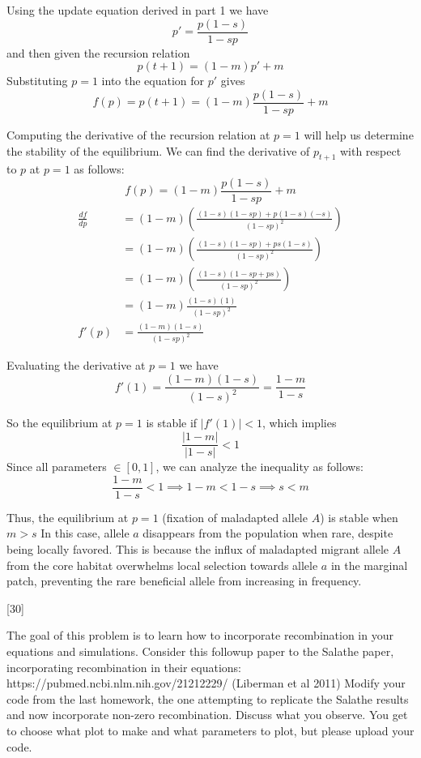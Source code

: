 \documentclass[11pt]{exam}
\begin{document}
\begin{questions}
\begin{enumerate}
\begin{mysolution}
    Using the update equation derived in part 1 we have
    \[
    p' = \frac{p(1-s)}{1-sp}
    \]
    and then given the recursion relation
    \[
    p(t+1) = (1-m)p' + m
    \]
    Substituting $p = 1$ into the equation for $p'$ gives
    \[
    f(p) = p(t+1) = (1-m) \frac{p(1-s)}{1-sp} + m
    \]

    Computing the derivative of the recursion relation at $p = 1$ will help us determine the stability of the equilibrium. We can find the derivative of $p_{t+1}$ with respect to $p$ at $p=1$ as follows:
    \[
    f(p) = (1-m) \frac{p(1-s)}{1-sp} + m
    \]
    \begin{align*}
    \frac{df}{dp} &= (1-m) \left( \frac{(1-s)(1-sp) + p(1-s)(-s)}{(1-sp)^2} \right) \\
    &= (1-m) \left( \frac{(1-s)(1-sp) + ps(1-s)}{(1-sp)^2} \right) \\
    &= (1-m) \left( \frac{(1-s)(1 - sp + ps)}{(1-sp)^2} \right) \\
    &= (1-m) \frac{(1-s)(1)}{(1-sp)^2} \\
    f'(p) &= \frac{(1-m)(1-s)}{(1-sp)^2}
    \end{align*}

    Evaluating the derivative at $p = 1$ we have
    \[
    f'(1) = \frac{(1-m)(1-s)}{(1-s)^2} = \frac{1-m}{1-s}
    \]

    So the equilibrium at $p = 1$ is stable if $|f'(1)| < 1$, which implies
    \[
    \frac{|1-m|}{|1-s|} < 1
    \]
    Since all parameters $\in [0,1]$, we can analyze the inequality as follows:
    \[
    \frac{1-m}{1-s} < 1 \implies 1-m < 1-s \implies s < m
    \]

    Thus, the equilibrium at $p=1$ (fixation of maladapted allele $A$) is stable when 
    \(
    m>s
    \)
    In this case, allele $a$ disappears from the population when rare, despite being locally favored. This is because the influx of maladapted migrant allele $A$ from the core habitat overwhelms local selection towards allele $a$ in the marginal patch, preventing the rare beneficial allele from increasing in frequency.
\end{mysolution}
\end{enumerate}

 [30] 

The goal of this problem is to learn how to incorporate recombination in your equations and
simulations. Consider this followup paper to the Salathe paper, incorporating recombination
in their equations: https://pubmed.ncbi.nlm.nih.gov/21212229/ (Liberman et al 2011)
Modify your code from the last homework, the one attempting to replicate the Salathe results
and now incorporate non-zero recombination. Discuss what you observe. You get to choose
what plot to make and what parameters to plot, but please upload your code.


\end{questions}
\end{document}
